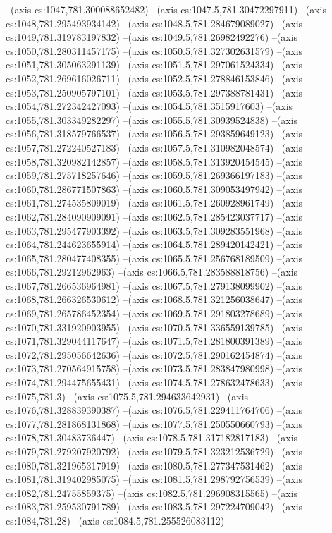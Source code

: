 --(axis cs:1047,781.300088652482)
--(axis cs:1047.5,781.30472297911)
--(axis cs:1048,781.295493934142)
--(axis cs:1048.5,781.284679089027)
--(axis cs:1049,781.319783197832)
--(axis cs:1049.5,781.26982492276)
--(axis cs:1050,781.280311457175)
--(axis cs:1050.5,781.327302631579)
--(axis cs:1051,781.305063291139)
--(axis cs:1051.5,781.297061524334)
--(axis cs:1052,781.269616026711)
--(axis cs:1052.5,781.278846153846)
--(axis cs:1053,781.250905797101)
--(axis cs:1053.5,781.297388781431)
--(axis cs:1054,781.272342427093)
--(axis cs:1054.5,781.3515917603)
--(axis cs:1055,781.303349282297)
--(axis cs:1055.5,781.30939524838)
--(axis cs:1056,781.318579766537)
--(axis cs:1056.5,781.293859649123)
--(axis cs:1057,781.272240527183)
--(axis cs:1057.5,781.310982048574)
--(axis cs:1058,781.320982142857)
--(axis cs:1058.5,781.313920454545)
--(axis cs:1059,781.275718257646)
--(axis cs:1059.5,781.269366197183)
--(axis cs:1060,781.286771507863)
--(axis cs:1060.5,781.309053497942)
--(axis cs:1061,781.274535809019)
--(axis cs:1061.5,781.260928961749)
--(axis cs:1062,781.284090909091)
--(axis cs:1062.5,781.285423037717)
--(axis cs:1063,781.295477903392)
--(axis cs:1063.5,781.309283551968)
--(axis cs:1064,781.244623655914)
--(axis cs:1064.5,781.289420142421)
--(axis cs:1065,781.280477408355)
--(axis cs:1065.5,781.256768189509)
--(axis cs:1066,781.29212962963)
--(axis cs:1066.5,781.283588818756)
--(axis cs:1067,781.266536964981)
--(axis cs:1067.5,781.279138099902)
--(axis cs:1068,781.266326530612)
--(axis cs:1068.5,781.321256038647)
--(axis cs:1069,781.265786452354)
--(axis cs:1069.5,781.291803278689)
--(axis cs:1070,781.331920903955)
--(axis cs:1070.5,781.336559139785)
--(axis cs:1071,781.329044117647)
--(axis cs:1071.5,781.281800391389)
--(axis cs:1072,781.295056642636)
--(axis cs:1072.5,781.290162454874)
--(axis cs:1073,781.270564915758)
--(axis cs:1073.5,781.283847980998)
--(axis cs:1074,781.294475655431)
--(axis cs:1074.5,781.278632478633)
--(axis cs:1075,781.3)
--(axis cs:1075.5,781.294633642931)
--(axis cs:1076,781.328839390387)
--(axis cs:1076.5,781.229411764706)
--(axis cs:1077,781.281868131868)
--(axis cs:1077.5,781.250550660793)
--(axis cs:1078,781.30483736447)
--(axis cs:1078.5,781.317182817183)
--(axis cs:1079,781.279207920792)
--(axis cs:1079.5,781.323212536729)
--(axis cs:1080,781.321965317919)
--(axis cs:1080.5,781.277347531462)
--(axis cs:1081,781.319402985075)
--(axis cs:1081.5,781.298792756539)
--(axis cs:1082,781.24755859375)
--(axis cs:1082.5,781.296908315565)
--(axis cs:1083,781.259530791789)
--(axis cs:1083.5,781.297224709042)
--(axis cs:1084,781.28)
--(axis cs:1084.5,781.255526083112)
